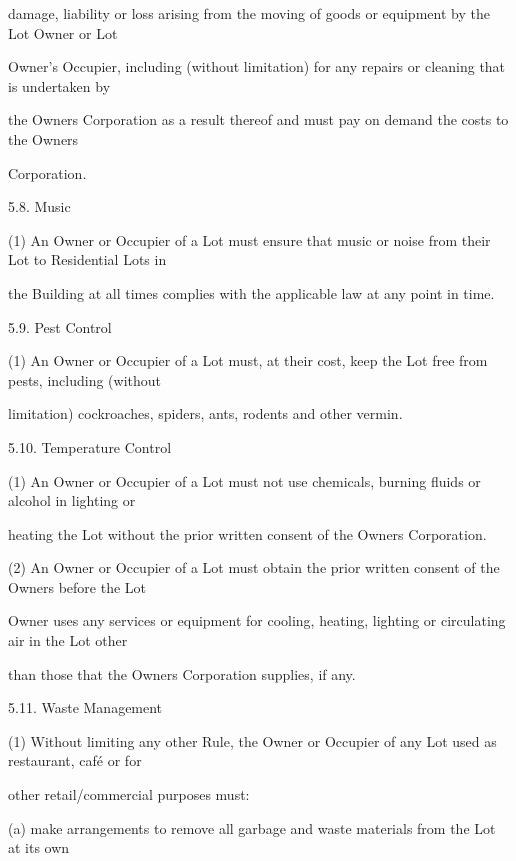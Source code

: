 \documentclass{article}
\begin{document}
{\fontsize{10.02}{1}damage, liability or loss arising from the moving of goods or equipment by the Lot Owner or Lot }

{\fontsize{10.02}{1}Owner’s Occupier, including (without limitation) for any repairs or cleaning that is undertaken by }

{\fontsize{10.02}{1}the Owners Corporation as a result thereof and must pay on demand the costs to the Owners }

{\fontsize{10.02}{1}Corporation. }

{\fontsize{9.99}{1}5.8. Music }

{\fontsize{9.962}{1}(1) An Owner or Occupier of a Lot must ensure that music or noise from their Lot to Residential Lots in }

{\fontsize{10.02}{1}the Building at all times complies with the applicable law at any point in time. }

{\fontsize{9.99}{1}5.9. Pest Control }

{\fontsize{9.962}{1}(1) An Owner or Occupier of a Lot must, at their cost, keep the Lot free from pests, including (without }

{\fontsize{10.02}{1}limitation) cockroaches, spiders, ants, rodents and other vermin. }

{\fontsize{9.99}{1}5.10. Temperature Control }

{\fontsize{9.962}{1}(1) An Owner or Occupier of a Lot must not use chemicals, burning fluids or alcohol in lighting or }

{\fontsize{10.02}{1}heating the Lot without the prior written consent of the Owners Corporation. }

{\fontsize{9.962}{1}(2) An Owner or Occupier of a Lot must obtain the prior written consent of the Owners before the Lot }

{\fontsize{10.02}{1}Owner uses any services or equipment for cooling, heating, lighting or circulating air in the Lot other }

{\fontsize{10.02}{1}than those that the Owners Corporation supplies, if any. }

{\fontsize{9.99}{1}5.11. Waste Management }

{\fontsize{9.962}{1}(1) Without limiting any other Rule, the Owner or Occupier of any Lot used as restaurant, café or for }

{\fontsize{10.02}{1}other retail/commercial purposes must: }

{\fontsize{9.962}{1}(a) make arrangements to remove all garbage and waste materials from the Lot at its own }
\end{document}
